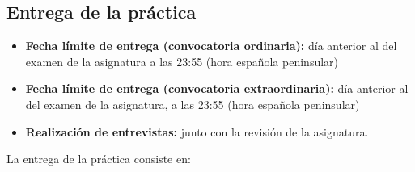 \subsection{Entrega de la práctica}
\label{sec:practica-2026-05-ltaw:entrega}

\begin{itemize}
  \item \textbf{Fecha límite de entrega (convocatoria ordinaria):} día anterior al del examen de la asignatura a las 23:55 (hora española peninsular)
  \item \textbf{Fecha límite de entrega (convocatoria extraordinaria):} día anterior al del examen de la asignatura, a las 23:55 (hora española peninsular)
  \item \textbf{Realización de entrevistas:} junto con la revisión de la asignatura.
\end{itemize}

La entrega de la práctica consiste en:


